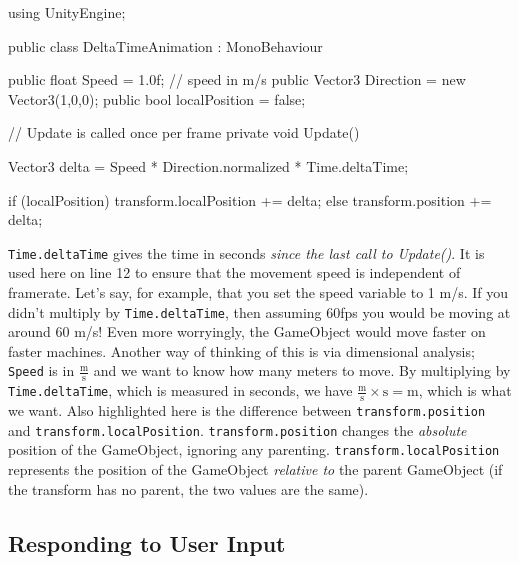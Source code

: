 \documentclass[11pt]{article}
\def\StartLineAt#1{\lstset{firstnumber=#1}}
\begin{document}
\StartLineAt{1}
\begin{csharp}
using UnityEngine;

public class DeltaTimeAnimation : MonoBehaviour
{
    public float Speed = 1.0f; // speed in m/s
    public Vector3 Direction = new Vector3(1,0,0);
    public bool localPosition = false;

    // Update is called once per frame
    private void Update()
    {
        Vector3 delta = Speed * Direction.normalized * Time.deltaTime;

        if (localPosition)
            transform.localPosition += delta;
        else
            transform.position += delta;
    }
}
\end{csharp}

\lstinline|Time.deltaTime| gives the time in seconds \textit{since the last call to Update()}.  It is
used here on line 12 to ensure that the movement speed is independent of framerate.  Let's say, for
example, that you set the speed variable to 1 m/s.  If you didn't multiply by \lstinline|Time.deltaTime|,
then assuming 60fps you would be moving at around 60 m/s!  Even more worryingly, the GameObject would
move faster on faster machines.  Another way of thinking of this is via dimensional analysis;
\lstinline|Speed| is in $\frac{\mathrm{m}}{\mathrm{s}}$ and we want to know how many meters to move.  
By multiplying by \lstinline|Time.deltaTime|, which is measured in seconds, we have
$\frac{\mathrm{m}}{\mathrm{s}} \times \mathrm{s} = \mathrm{m}$, which is what we want.  Also highlighted
here is the difference between \lstinline|transform.position| and \lstinline|transform.localPosition|.
\lstinline|transform.position| changes the \textit{absolute} position of the GameObject, ignoring
any parenting.  \lstinline|transform.localPosition| represents the position of the GameObject
\textit{relative to} the parent GameObject (if the transform has no parent, the two values are the same).

\subsection{Responding to User Input}
\end{document}
